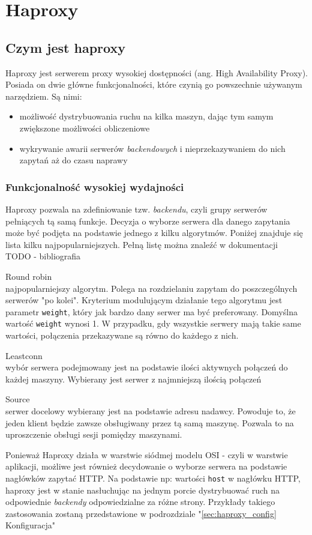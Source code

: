 {\section{Haproxy}
\subsection{Czym jest haproxy}
Haproxy jest serwerem proxy wysokiej dostępności (ang. High Availability Proxy).\\
Posiada on dwie główne funkcjonalności, które czynią go powszechnie używanym narzędziem.
Są nimi:\\
\begin{itemize}
	\item możliwość dystrybuowania ruchu na kilka maszyn, dając tym samym zwiększone możliwości obliczeniowe
	\item wykrywanie awarii serwerów \textit{backendowych} i nieprzekazywaniem do nich zapytań aż do czasu naprawy
\end{itemize}
\subsubsection{Funkcjonalność wysokiej wydajności}
Haproxy pozwala na zdefiniowanie tzw. \textit{backendu}, czyli grupy serwerów pełniących tą samą funkcje.
Decyzja o wyborze serwera dla danego zapytania może być podjęta na podstawie jednego z kilku algorytmów.
Poniżej znajduje się lista kilku najpopularniejszych. Pełną listę można znaleźć w dokumentacji\\
\LARGE TODO - bibliografia\normalsize
\begin{description}
	\item{Round robin}\\
		najpopularniejszy algorytm. Polega na rozdzielaniu zapytam do poszczególnych serwerów "po kolei".
		Kryterium modulującym działanie tego algorytmu jest parametr \texttt{weight}, który jak bardzo dany serwer ma być preferowany.
		Domyślna wartość \texttt{weight} wynosi 1. W przypadku, gdy wszystkie serwery mają takie same wartości, połączenia przekazywane są równo do każdego z nich.
	\item{Leastconn}\\
		wybór serwera podejmowany jest na podstawie ilości aktywnych połączeń do każdej maszyny.
		Wybierany jest serwer z najmniejszą ilością połączeń
	\item{Source}\\
		serwer docelowy wybierany jest na podstawie adresu nadawcy.
		Powoduje to, że jeden klient będzie zawsze obsługiwany przez tą samą maszynę. Pozwala to na uproszczenie obsługi sesji pomiędzy maszynami.
\end{description}
Ponieważ Haproxy działa w warstwie siódmej modelu OSI - czyli w warstwie aplikacji, możliwe jest również decydowanie o wyborze serwera na podstawie nagłówków zapytać HTTP.
Na podstawie np: wartości \texttt{host} w nagłówku HTTP, haproxy jest w stanie nasłuchując na jednym porcie dystrybuować ruch na odpowiednie \textit{backendy} odpowiedzialne za różne strony.
Przykłady takiego zastosowania zostaną przedstawione w podrozdziale "\ref{sec:haproxy_config} Konfiguracja"
}
